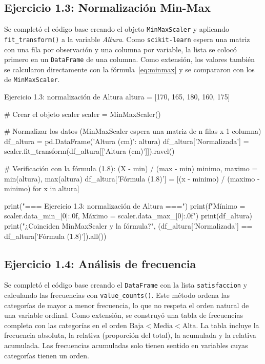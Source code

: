 \documentclass[11pt,letterpaper]{article}
\begin{document}
\subsection{Ejercicio 1.3: Normalización Min-Max}

Se completó el código base creando el objeto \texttt{MinMaxScaler} y aplicando \texttt{fit\_transform()} a la variable \textit{Altura}. Como \texttt{scikit-learn} espera una matriz con una fila por observación y una columna por variable, la lista se colocó primero en un \texttt{DataFrame} de una columna. Como extensión, los valores también se calcularon directamente con la fórmula~\eqref{eq:minmax} y se compararon con los de \texttt{MinMaxScaler}.

\begin{codigo}[label=cod:ej13]{Ejercicio 1.3: normalización de Altura}
altura = [170, 165, 180, 160, 175]

# Crear el objeto scaler
scaler = MinMaxScaler()

# Normalizar los datos (MinMaxScaler espera una matriz de n filas x 1 columna)
df_altura = pd.DataFrame({'Altura (cm)': altura})
df_altura['Normalizada'] = scaler.fit_transform(df_altura[['Altura (cm)']]).ravel()

# Verificación con la fórmula (1.8): (X - min) / (max - min)
minimo, maximo = min(altura), max(altura)
df_altura['Fórmula (1.8)'] = [(x - minimo) / (maximo - minimo) for x in altura]

print("\n=== Ejercicio 1.3: normalización de Altura ===")
print(f"Mínimo = {scaler.data_min_[0]:.0f}, Máximo = {scaler.data_max_[0]:.0f}")
print(df_altura)
print("¿Coinciden MinMaxScaler y la fórmula?",
      (df_altura['Normalizada'] == df_altura['Fórmula (1.8)']).all())
\end{codigo}

\subsection{Ejercicio 1.4: Análisis de frecuencia}

Se completó el código base creando el \texttt{DataFrame} con la lista \texttt{satisfaccion} y calculando las frecuencias con \texttt{value\_counts()}. Este método ordena las categorías de mayor a menor frecuencia, lo que no respeta el orden natural de una variable ordinal. Como extensión, se construyó una tabla de frecuencias completa con las categorías en el orden $\text{Baja} < \text{Media} < \text{Alta}$. La tabla incluye la frecuencia absoluta, la relativa (proporción del total), la acumulada y la relativa acumulada. Las frecuencias acumuladas solo tienen sentido en variables cuyas categorías tienen un orden.
\end{document}
